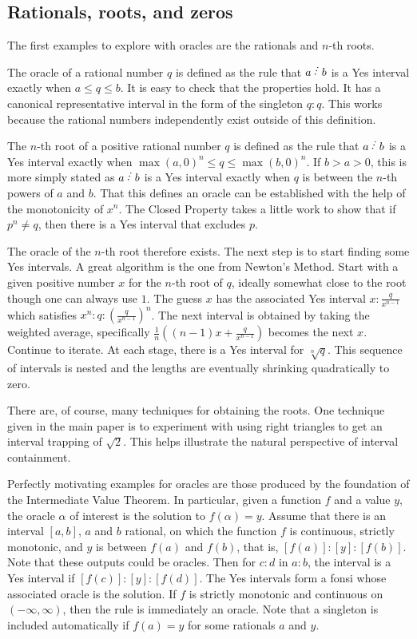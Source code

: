 \documentclass[12pt]{article}
\begin{document}
\subsection{Rationals, roots, and zeros}

The first examples to explore with oracles are the rationals and $n$-th roots. 

The oracle of a rational number $q$ is defined as the rule that $a\lte b$ is a Yes interval exactly when $a \leq q \leq b$. It is easy to check that the properties hold. It has a canonical representative interval in the form of the singleton $q:q$. This works because the rational numbers independently exist outside of this definition. 

The $n$-th root of a positive rational number $q$ is defined as the rule that $a\lte b$ is a Yes interval exactly when $\max(a, 0)^n \leq q \leq \max(b,0)^n$. If $b > a> 0$, this is more simply stated as $a\lte b$ is a Yes interval exactly when $q$ is between the $n$-th powers of $a$ and $b$. That this defines an oracle can be established with the help of the monotonicity of $x^n$. The Closed Property takes a little work to show that if $p^n \neq q$, then there is a Yes interval that excludes $p$. 

The oracle of the $n$-th root therefore exists. The next step is to start finding some Yes intervals. A great algorithm is the one from Newton's Method. Start with a given positive number $x$ for the $n$-th root of $q$, ideally somewhat close to the root though one can always use $1$. The guess $x$ has the associated Yes interval $x:\frac{q}{x^{n-1}}$ which satisfies $x^n : q : (\frac{q}{x^{n-1}})^n$. The next interval is obtained by taking the weighted average, specifically $\frac{1}{n}( (n-1) x + \frac{q}{x^{n-1}} )$ becomes the next $x$. Continue to iterate. At each stage, there is a Yes interval for $\sqrt[n]{q}$. This sequence of intervals is nested and the lengths are eventually shrinking quadratically to zero.  

There are, of course, many techniques for obtaining the roots. One technique given in the main paper is to experiment with using right triangles to get an interval trapping of $\sqrt{2}$. This helps illustrate the natural perspective of interval containment.  

Perfectly motivating examples for oracles are those produced by the foundation of the Intermediate Value Theorem. In particular, given a function $f$ and a value $y$, the oracle $\alpha$ of interest is the solution to $f(\alpha) = y$. Assume that there is an interval $[a,b]$, $a$ and $b$ rational,  on which the function $f$ is continuous, strictly monotonic, and $y$ is between $f(a)$ and $f(b)$, that is, $[f(a)] : [y] : [f(b)]$. Note that these outputs could be oracles. Then for $c:d$ in $a:b$, the interval is a Yes interval if $[f(c)]: [y] : [f(d)]$. The Yes intervals form a fonsi whose associated oracle is the solution.  If $f$ is strictly monotonic and continuous on $(-\infty, \infty)$, then the rule is immediately an oracle. Note that a singleton is included automatically if $f(a) =y $ for some rationals $a$ and $y$.
\end{document}
